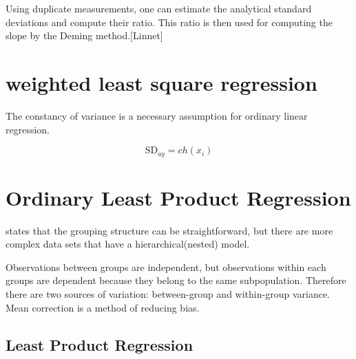 \documentclass[12pt, a4paper]{report}
\theoremstyle{plain}
\theoremstyle{definition}
\theoremstyle{remark}
\begin{document}
Using duplicate measurements, one can estimate the analytical
standard deviations and compute their ratio. This ratio is then
used for computing the slope by the Deming method.[Linnet]



\section{weighted least square regression}
The constancy of variance is a necessary assumption for ordinary
linear regression.

\begin{equation}
	\mbox{SD}_{ay}  = ch(x_{i})
\end{equation}


\section{Ordinary Least Product Regression}
\citet{ludbrook97} states that the grouping structure can be
straightforward, but there are more complex data sets that have a hierarchical(nested) model.

Observations between groups are independent, but observations
within each groups are dependent because they belong to the same
subpopulation. Therefore there are two sources of variation:
between-group and within-group variance.
 \vspace{5 mm} \noindent Mean correction is a method of reducing
bias.


\subsection{Least Product Regression}
\end{document}

